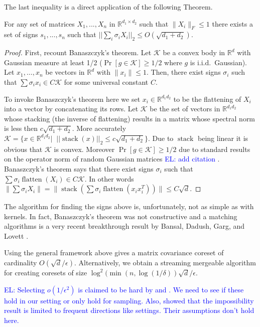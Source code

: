 \documentclass[anon,12pt]{colt2019} %
\newcommand{\el}[1]{\textcolor{blue}{EL: #1}}
\newcommand{\R}{\mathbb{R}}
\newcommand{\eps}{\epsilon}
\begin{document}
\noindent The last inequality is a direct application of the following Theorem.
\begin{theorem}\label{BansalInDaHouz}
For any set of matrices $X_1,...,X_n$ in $\R^{d_1 \times d_2}$ such that $\|X_i\|_{F} \le 1$ there exists a set of signs $s_1,...,s_n$ such that $||\sum_i \sigma_i X_i||_{2} \le O(\sqrt{d_1 + d_2})$.
\end{theorem}
\begin{proof}
First, recount Banaszczyk's theorem. 
Let $\mathcal K$ be a convex body in $\R^d$ with Gaussian measure at least 1/2 ($\Pr[g \in \mathcal K] \ge 1/2$ where $g$ is i.i.d.\ Gaussian).
Let $x_1,\ldots,x_n$ be vectors in $\R^d$ with $\|x_i\| \le 1$. 
Then, there exist signs $\sigma_i$ such that $\sum \sigma_i x_i \in C \mathcal K$ for some universal constant $C$.

To invoke Banaszczyk's theorem here we set $x_i \in \R^{d_1d_2}$ to be the flattening of $X_i$ into a vector by concatenating its rows. 
Let $\mathcal K$ be the set of vectors in $\R^{d_1d_2}$ whose stacking (the inverse of flattening) results in a matrix whose spectral norm is less then $c\sqrt{d_1 + d_2}$.
More accurately $\mathcal K = \{x  \in \R^{d_1d_2} |\;\; ||\operatorname{stack}(x)||_2 \le c\sqrt{d_1+d_2}\}$. 
Due to $\operatorname{stack}$ being linear it is obvious that $\mathcal K$ is convex. 
Moreover $\Pr[g \in \mathcal K] \ge 1/2$ due to standard results on the operator norm of random Gaussian matrices \el{add citation \cite{}}.
Banaszczyk's theorem says that there exist signs $\sigma_i$ such that $\sum \sigma_i \operatorname{flatten}(X_i) \in C \mathcal K$.
In other words $\| \sum \sigma_i X_i\| = \| \operatorname{stack}( \sum \sigma_i \operatorname{flatten}(x_i x_i^T)) \| \le C \sqrt{d}$. 
\end{proof}
The algorithm for finding the signs above is, unfortunately, not as simple as with kernels. 
In fact, Banaszczyk's theorem was not constructive and a matching algorithms is a very recent breakthrough result by Bansal, Dadush, Garg, and Lovett \cite{DBLP:conf/stoc/BansalDGL18}.

Using the general framework above gives a matrix covariance coreset of cardinality $O(\sqrt{d}/\eps)$.
Alternatively, we obtain a streaming mergeable algorithm for creating coresets of size $\log^{2}(\min(n, \log(1/\delta)) \sqrt{d}/\eps$.



\el{Selecting $o(1/\eps^2)$ is claimed to be hard by \cite{DBLP:conf/focs/DeshpandeR10} and \cite{DBLP:conf/soda/DeshpandeRVW06}. We need to see if these hold in our setting or only hold for sampling.  Also, \cite{DBLP:conf/soda/GhashamiP14} showed that the impossibility result is limited to frequent directions like settings. Their assumptions don't hold here.} 
\end{document}
